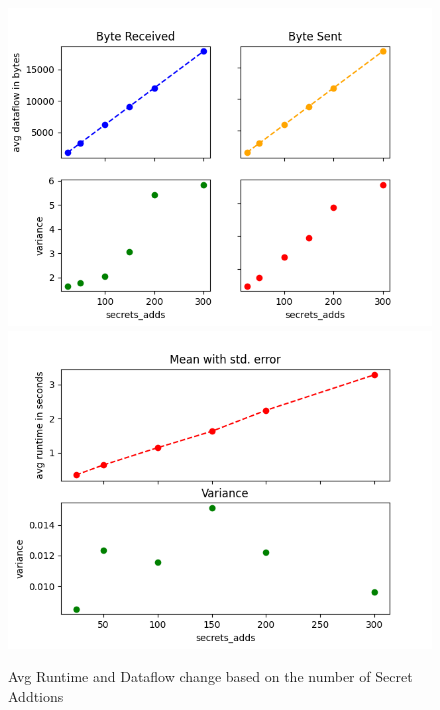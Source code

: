 \documentclass[10pt,conference,compsocconf]{IEEEtran}
\begin{document}
\begin{figure}[ht]
    \centering
    \includegraphics[width=0.49\linewidth]{../performance_analysis/dataflow_secrets_additions.png}
    \includegraphics[width=0.49\linewidth]{../performance_analysis/runtime_secrets_additions.png}
    \caption{Avg Runtime and Dataflow change based on the number of Secret Addtions}
\end{figure}
\end{document}
